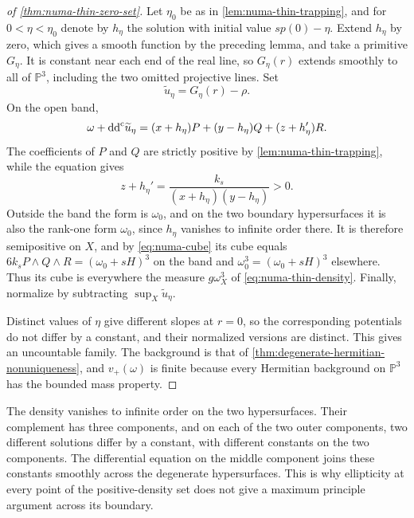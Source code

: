 \begin{proof}[of \cref{thm:numa-thin-zero-set}]
Let $\eta_0$ be as in \cref{lem:numa-thin-trapping}, and for $0<\eta<\eta_0$ denote by $h_\eta$ the solution with initial value $sp(0)-\eta$. Extend $h_\eta$ by zero, which gives a smooth function by the preceding lemma, and take a primitive $G_\eta$. It is constant near each end of the real line, so $G_\eta(r)$ extends smoothly to all of $\mathbb P^3$, including the two omitted projective lines. Set
\[
 \widetilde u_\eta=G_\eta(r)-\rho.
\]
On the open band,
\[
 \omega+\mathrm{dd}^{\mathrm{c}}\widetilde u_\eta
 =(x+h_\eta)P+(y-h_\eta)Q+(z+h_\eta')R.
\]
The coefficients of $P$ and $Q$ are strictly positive by \cref{lem:numa-thin-trapping}, while the equation gives
\[
 z+h_\eta'=\frac{k_s}{(x+h_\eta)(y-h_\eta)}>0.
\]
Outside the band the form is $\omega_0$, and on the two boundary hypersurfaces it is also the rank-one form $\omega_0$, since $h_\eta$ vanishes to infinite order there. It is therefore semipositive on $X$, and by \eqref{eq:numa-cube} its cube equals $6k_sP\wedge Q\wedge R=(\omega_0+sH)^3$ on the band and $\omega_0^3=(\omega_0+sH)^3$ elsewhere. Thus its cube is everywhere the measure $g\omega_X^3$ of \eqref{eq:numa-thin-density}. Finally, normalize by subtracting $\sup_X\widetilde u_\eta$.

Distinct values of $\eta$ give different slopes at $r=0$, so the corresponding potentials do not differ by a constant, and their normalized versions are distinct. This gives an uncountable family. The background is that of \cref{thm:degenerate-hermitian-nonuniqueness}, and $v_+(\omega)$ is finite because every Hermitian background on $\mathbb P^3$ has the bounded mass property.
\end{proof}

The density vanishes to infinite order on the two hypersurfaces. Their complement has three components, and on each of the two outer components, two different solutions differ by a constant, with different constants on the two components. The differential equation on the middle component joins these constants smoothly across the degenerate hypersurfaces. This is why ellipticity at every point of the positive-density set does not give a maximum principle argument across its boundary.

